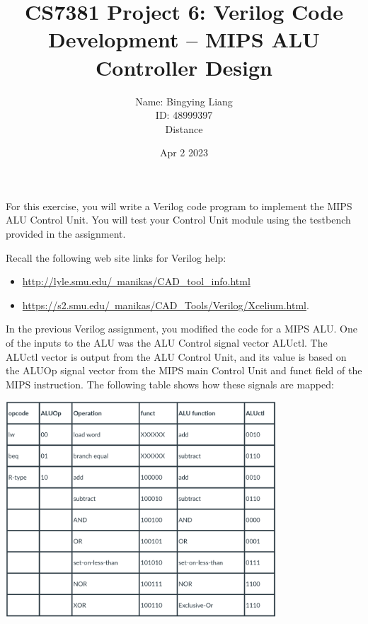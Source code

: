 \documentclass[12pt]{article}
\title{CS7381 Project 6: Verilog Code Development – MIPS ALU Controller Design }
\author{
Name: Bingying Liang \\
ID: 48999397\\  
Distance}
\date{Apr 2 2023}
\begin{document}
\maketitle
For this exercise, you will write a Verilog code program to implement the MIPS ALU Control Unit.    You will test your Control Unit module using the testbench provided in the assignment. 

Recall the following web site links for Verilog help:
\begin{itemize}
    \item \href{http://lyle.smu.edu/~manikas/CAD_tool_info.html} {http://lyle.smu.edu/~manikas/CAD\_tool\_info.html}
    \item \href{https://s2.smu.edu/~manikas/CAD_Tools/Verilog/Xcelium.html}{https://s2.smu.edu/~manikas/CAD\_Tools/Verilog/Xcelium.html}. 
\end{itemize}
In the previous Verilog assignment, you modified the code for a MIPS ALU. One of the inputs to the ALU was the ALU Control signal vector ALUctl. The ALUctl vector is output from the ALU Control Unit, and its value is based on the ALUOp signal vector from the MIPS main Control Unit and funct field of the MIPS instruction. The following table shows how these signals are mapped:
        \begin{center}
        \includegraphics[width=0.76\textwidth]{p1.png}
        \end{center}
\end{document}
